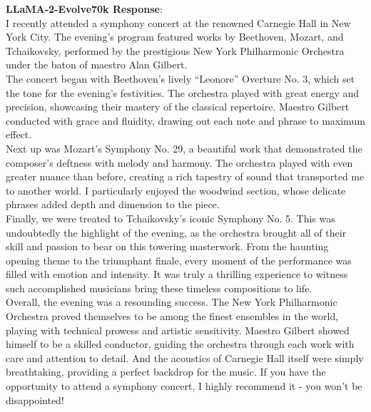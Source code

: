 \documentclass{article} %
\newcommand{\llama}{LLaMA}
\begin{document}
\begin{tcolorbox}[breakable,boxrule=0pt]
  \textbf{\llama{}-2-Evolve70k Response}: \\ I recently attended a symphony concert at the renowned Carnegie Hall in New York City. The evening's program featured works by Beethoven, Mozart, and Tchaikovsky, performed by the prestigious New York Philharmonic Orchestra under the baton of maestro Alan Gilbert. \\The concert began with Beethoven's lively ``Leonore'' Overture No. 3, which set the tone for the evening's festivities. The orchestra played with great energy and precision, showcasing their mastery of the classical repertoire. Maestro Gilbert conducted with grace and fluidity, drawing out each note and phrase to maximum effect.\\Next up was Mozart's Symphony No. 29, a beautiful work that demonstrated the composer's deftness with melody and harmony. The orchestra played with even greater nuance than before, creating a rich tapestry of sound that transported me to another world. I particularly enjoyed the woodwind section, whose delicate phrases added depth and dimension to the piece.\\Finally, we were treated to Tchaikovsky's iconic Symphony No. 5. This was undoubtedly the highlight of the evening, as the orchestra brought all of their skill and passion to bear on this towering masterwork. From the haunting opening theme to the triumphant finale, every moment of the performance was filled with emotion and intensity. It was truly a thrilling experience to witness such accomplished musicians bring these timeless compositions to life.\\Overall, the evening was a resounding success. The New York Philharmonic Orchestra proved themselves to be among the finest ensembles in the world, playing with technical prowess and artistic sensitivity. Maestro Gilbert showed himself to be a skilled conductor, guiding the orchestra through each work with care and attention to detail. And the acoustics of Carnegie Hall itself were simply breathtaking, providing a perfect backdrop for the music. If you have the opportunity to attend a symphony concert, I highly recommend it - you won't be disappointed! \\

\end{tcolorbox}
\end{document}
